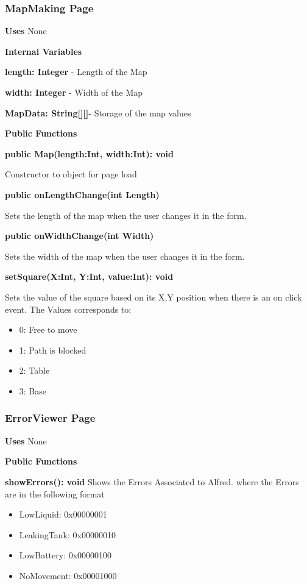 \documentclass [10pt]{article}
\begin{document}
\subsubsection{MapMaking Page}
\textbf{Uses}
None

\textbf{Internal Variables}

\textbf{length: Integer} - Length of the Map

\textbf{width: Integer} - Width of the Map

\textbf{MapData: String[][]}- Storage of the map values

\textbf{Public Functions}

\textbf{public Map(length:Int, width:Int): void}

Constructor to object for page load

\textbf{public onLengthChange(int Length)}

Sets the length of the map when the user changes it in the form.

\textbf{public onWidthChange(int Width)}

Sets the width of the map when the user changes it in the form.

\textbf{setSquare(X:Int, Y:Int, value:Int): void}

Sets the value of the square based on its X,Y position when there is an on click event. The Values corresponds to: 
 
\begin{itemize}
	\item 0: Free to move
	\item 1: Path is blocked
	\item 2: Table
	\item 3: Base
\end{itemize}

\subsubsection{ErrorViewer Page}
\textbf{Uses}
None

\textbf{Public Functions}

\textbf{ showErrors(): void}
Shows the Errors Associated to Alfred. where the Errors are in the following format
\begin{itemize}
	\item LowLiquid: 0x00000001
	\item LeakingTank: 0x00000010
	\item LowBattery: 0x00000100
	\item NoMovement: 0x00001000
\end{itemize}
\end{document}
